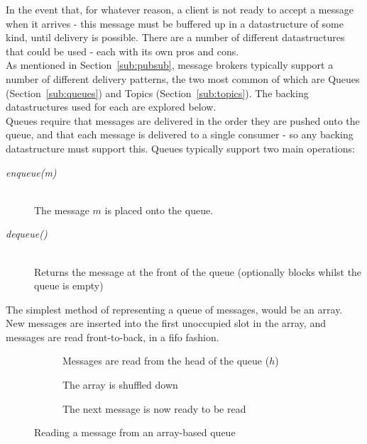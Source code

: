 In the event that, for whatever reason, a client is not ready to accept a
message when it arrives - this message must be buffered up in a datastructure of
some kind, until delivery is possible. There are a number of different
datastructures that could be used - each with its own pros and cons. \\

As mentioned in Section~\ref{sub:pubsub}, message brokers typically support a
number of different delivery patterns, the two most common of which are Queues
(Section~\ref{sub:queues}) and Topics (Section~\ref{sub:topics}). The backing
datastructures used for each are explored below. \\

Queues require that messages are delivered in the order they are pushed onto the
queue, and that each message is delivered to a single consumer - so any backing
datastructure must support this. Queues typically support two main operations:

\begin{description}
  \item[\textit{enqueue(m)}] \hfill \\
    The message $m$ is placed onto the queue.
  \item[\textit{dequeue()}] \hfill \\
    Returns the message at the front of the queue (optionally blocks whilst the queue is empty)
\end{description}

The simplest method of representing a queue of messages, would be an array. New
messages are inserted into the first unoccupied slot in the array, and messages
are read front-to-back, in a \gls{fifo} fashion.

\begin{figure}[H]
  \centering
  \begin{subfigure}[b]{\textwidth}
    \centering
    
    \caption{Messages are read from the head of the queue ($h$)}
    \label{fig:tikz:queueArrayInitial}
  \end{subfigure}

  \begin{subfigure}[b]{\textwidth}
    \centering
    
    \caption{The array is shuffled down}
    \label{fig:tikz:queueArrayHeadRead}
  \end{subfigure}

  \begin{subfigure}[b]{\textwidth}
    \centering
    
    \caption{The next message is now ready to be read}
    \label{fig:tikz:queueArrayPostShuffle}
  \end{subfigure}
  \caption{Reading a message from an array-based queue}
  \label{fig:tikz:queueArray}
\end{figure}

